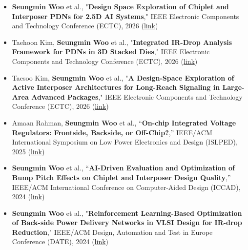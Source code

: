 \documentclass[10pt,letter,ragged2e]{altacv}
\begin{document}
\begin{itemize}
    \item \textbf{Seungmin Woo} et al., "\textbf{Design Space Exploration of Chiplet and Interposer PDNs for 2.5D AI Systems}," IEEE Electronic Components and Technology Conference (ECTC), 2026 (\href{https://ieeexplore.ieee.org/abstract/document/11561248}{link})
    \item Taehoon Kim, \textbf{Seungmin Woo} et al., "\textbf{Integrated IR-Drop Analysis Framework for PDNs in 3D Stacked Dies}," IEEE Electronic Components and Technology Conference (ECTC), 2026 (\href{https://ieeexplore.ieee.org/abstract/document/11561267}{link})
    \item Taesoo Kim, \textbf{Seungmin Woo} et al., "\textbf{A Design-Space Exploration of Active Interposer Architectures for Long-Reach Signaling in Large-Area Advanced Packages}," IEEE Electronic Components and Technology Conference (ECTC), 2026 (\href{https://ieeexplore.ieee.org/abstract/document/11561129}{link})
    \item Amaan Rahman, \textbf{Seungmin Woo} et al., “\textbf{On-chip Integrated Voltage Regulators: Frontside, Backside, or Off-Chip?},” IEEE/ACM International Symposium on Low Power Electronics and Design (ISLPED), 2025 (\href{https://doi.org/10.1109/ISLPED65674.2025.11261800}{link})
    \item \textbf{Seungmin Woo} et al., “\textbf{AI-Driven Evaluation and Optimization of Bump Pitch Effects on Chiplet and Interposer Design Quality},” IEEE/ACM International Conference on Computer-Aided Design (ICCAD), 2024 (\href{https://doi.org/10.1145/3676536.3676817}{link})
    \item \textbf{Seungmin Woo} et al., "\textbf{Reinforcement Learning-Based Optimization of Back-side Power Delivery Networks in VLSI Design for IR-drop Reduction}," IEEE/ACM Design, Automation and Test in Europe Conference (DATE), 2024 (\href{https://doi.org/10.23919/DATE58400.2024.10546599}{link})
\end{itemize}
\end{document}
